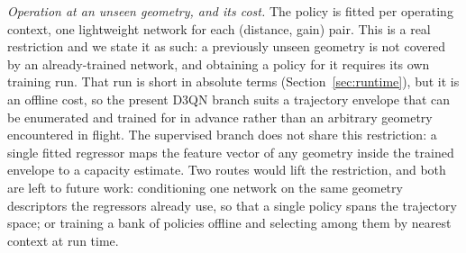 \documentclass[journal]{IEEEtran}
\begin{document}
\emph{Operation at an unseen geometry, and its cost.} The policy is fitted per operating
context, one lightweight network for each (distance, gain) pair. This is a real
restriction and we state it as such: a previously unseen geometry is not covered by an
already-trained network, and obtaining a policy for it requires its own training run.
That run is short in absolute terms (Section~\ref{sec:runtime}), but it is an offline
cost, so the present D3QN branch suits a trajectory envelope that can be enumerated and
trained for in advance rather than an arbitrary geometry encountered in flight. The
supervised branch does not share this restriction: a single fitted regressor maps the
feature vector of any geometry inside the trained envelope to a capacity estimate. Two
routes would lift the restriction, and both are left to future work: conditioning one
network on the same geometry descriptors the regressors already use, so that a single
policy spans the trajectory space; or training a bank of policies offline and selecting
among them by nearest context at run time.
\end{document}
